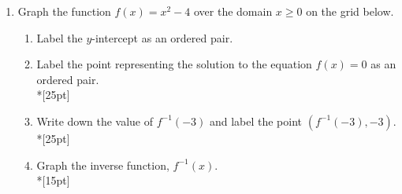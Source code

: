 \documentclass[]{book}
\begin{document}
\begin{enumerate}
\newpage
\item Graph the function $f(x) = x^2 - 4$ over the domain $x \geq 0$ on the grid below. 
\begin{enumerate}
    \item Label the $y$-intercept as an ordered pair.
    \item Label the point representing the solution to the equation $f(x)=0$ as an ordered pair.\\*[25pt]
    \item Write down the value of $f^{-1}(-3)$ and label the point $(f^{-1}(-3), -3)$.\\*[25pt]
    \item Graph the inverse function, $f^{-1}(x)$.\\*[15pt]
\end{enumerate}

\begin{figure}[!htbp]
\begin{center}
\end{center}
\end{figure}



\end{enumerate}
\end{document}
